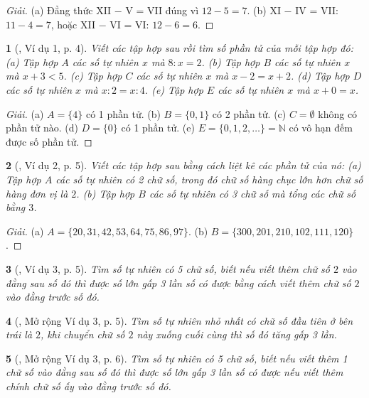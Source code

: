 \documentclass{article}
\newtheorem{baitoan}{}
\begin{document}
\begin{proof}[Giải]
	(a) Đẳng thức XII $-$ V = VII đúng vì $12 - 5 = 7$. (b) XI $-$ IV = VII: $11 - 4 = 7$, hoặc XII $-$ VI = VI: $12 - 6 = 6$.
\end{proof}

\begin{baitoan}[\cite{Binh_Toan_6_tap_1}, Ví dụ 1, p. 4]
	Viết các tập hợp sau rồi tìm số phần tử của mỗi tập hợp đó: (a) Tập hợp $A$ các số tự nhiên $x$ mà $8:x = 2$. (b) Tập hợp $B$ các số tự nhiên $x$ mà $x + 3 < 5$. (c) Tập hợp $C$ các số tự nhiên $x$ mà $x - 2 = x + 2$. (d) Tập hợp $D$ các số tự nhiên $x$ mà $x:2 = x:4$. (e) Tập hợp $E$ các số tự nhiên $x$ mà $x + 0 = x$.
\end{baitoan}

\begin{proof}[Giải]
	(a) $A = \{4\}$ có 1 phần tử. (b) $B = \{0,1\}$ có 2 phần tử. (c) $C = \emptyset$ không có phần tử nào. (d) $D = \{0\}$ có 1 phần tử. (e) $E = \{0,1,2,\ldots\} = \mathbb{N}$ có vô hạn đếm được số phần tử.
\end{proof}

\begin{baitoan}[\cite{Binh_Toan_6_tap_1}, Ví dụ 2, p. 5]
	Viết các tập hợp sau bằng cách liệt kê các phần tử của nó: (a) Tập hợp $A$ các số tự nhiên có 2 chữ số, trong đó chữ số hàng chục lớn hơn chữ số hàng đơn vị là $2$. (b) Tập hợp $B$ các số tự nhiên có 3 chữ số mà tổng các chữ số bằng $3$.
\end{baitoan}

\begin{proof}[Giải]
	(a) $A = \{20,31,42,53,64,75,86,97\}$. (b) $B = \{300,201,210,102,111,120\}$.
\end{proof}

\begin{baitoan}[\cite{Binh_Toan_6_tap_1}, Ví dụ 3, p. 5]
	Tìm số tự nhiên có 5 chữ số, biết nếu viết thêm chữ số $2$ vào đằng sau số đó thì được số lớn gấp 3 lần số có được bằng cách viết thêm chữ số $2$ vào đằng trước số đó.
\end{baitoan}

\begin{baitoan}[\cite{Binh_Toan_6_tap_1}, Mở rộng Ví dụ 3, p. 5]
	Tìm số tự nhiên nhỏ nhất có chữ số đầu tiên ở bên trái là $2$, khi chuyển chữ số $2$ này xuống cuối cùng thì số đó tăng gấp 3 lần.
\end{baitoan}

\begin{baitoan}[\cite{Binh_Toan_6_tap_1}, Mở rộng Ví dụ 3, p. 6]
	Tìm số tự nhiên có 5 chữ số, biết nếu viết thêm 1 chữ số vào đằng sau số đó thì được số lớn gấp 3 lần số có được nếu viết thêm chính chữ số ấy vào đằng trước số đó.
\end{baitoan}
\end{document}
